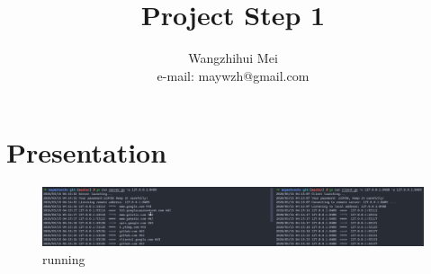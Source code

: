 \documentclass[a4paper,10pt]{article}
\begin{document}
%
   \title{Project Step 1}

   \author{Wangzhihui Mei \\ e-mail: maywzh@gmail.com}
          
   \date{}

   \maketitle
   
  \newpage
    
\section*{Presentation}
  \begin{figure}[]
    \centering
    \includegraphics[width=1.0\textwidth]{image/img1.png}
    \caption{running}
  \end{figure}
\end{document}
